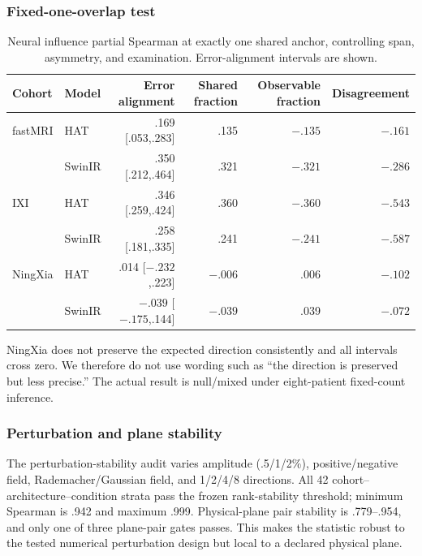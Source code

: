 \subsubsection{Fixed-one-overlap test}
\begin{table}[t]
\centering
\caption{Neural influence partial Spearman at exactly one shared anchor, controlling span, asymmetry, and examination. Error-alignment intervals are shown.}
\label{tab:fixed}
\setlength{\tabcolsep}{4pt}
\begin{tabular}{llrrrr}
\toprule
Cohort & Model & Error alignment & Shared fraction & Observable fraction & Disagreement \\
\midrule
fastMRI & HAT & .169 [.053,.283] & .135 & $-.135$ & $-.161$ \\
 & SwinIR & .350 [.212,.464] & .321 & $-.321$ & $-.286$ \\
IXI & HAT & .346 [.259,.424] & .360 & $-.360$ & $-.543$ \\
 & SwinIR & .258 [.181,.335] & .241 & $-.241$ & $-.587$ \\
NingXia & HAT & .014 [$-.232$,.223] & $-.006$ & .006 & $-.102$ \\
 & SwinIR & $-.039$ [$-.175$,.144] & $-.039$ & .039 & $-.072$ \\
\bottomrule
\end{tabular}
\end{table}

NingXia does not preserve the expected direction consistently and all intervals cross zero. We therefore do not use wording such as “the direction is preserved but less precise.” The actual result is null/mixed under eight-patient fixed-count inference.

\subsubsection{Perturbation and plane stability}
The perturbation-stability audit varies amplitude (.5/1/2\%), positive/negative field, Rademacher/Gaussian field, and 1/2/4/8 directions. All 42 cohort--architecture--condition strata pass the frozen rank-stability threshold; minimum Spearman is .942 and maximum .999. Physical-plane pair stability is .779--.954, and only one of three plane-pair gates passes. This makes the statistic robust to the tested numerical perturbation design but local to a declared physical plane.

